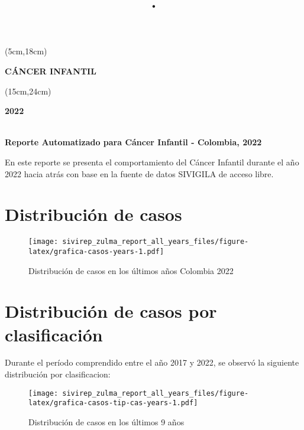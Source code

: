 \documentclass[
  a4paper,
]{article}
\title{\textcolor{colortitle}{.}}
\author{}
\date{\vspace{-2.5em}}
\begin{document}
\maketitle

\begin{textblock*}{15cm}(5cm,18cm) %
  \begin{flushright}
     \Huge{\textbf{CÁNCER INFANTIL \\ }}
  \end{flushright}
\end{textblock*}

\begin{textblock*}{5cm}(15cm,24cm) %
  \begin{flushright}
     \Huge{\textbf{2022}}
  \end{flushright}
\end{textblock*}

\newpage

\begin{center}
  \huge{\textbf{\\ Reporte Automatizado para Cáncer Infantil  - Colombia, 2022}}
\end{center}


En este reporte se presenta el comportamiento del Cáncer Infantil
durante el año 2022 hacia atrás con base en la fuente de datos SIVIGILA
de acceso libre.

\hypertarget{distribuciuxf3n-de-casos}{%
\section{Distribución de casos}\label{distribuciuxf3n-de-casos}}

\begin{figure}
\centering
\texttt{[image: sivirep\_zulma\_report\_all\_years\_files/figure-latex/grafica-casos-years-1.pdf]}
\caption{Distribución de casos en los últimos años Colombia 2022}
\end{figure}

\hypertarget{distribuciuxf3n-de-casos-por-clasificaciuxf3n}{%
\section{Distribución de casos por
clasificación}\label{distribuciuxf3n-de-casos-por-clasificaciuxf3n}}

Durante el período comprendido entre el año 2017 y 2022, se observó la
siguiente distribución por clasificacion:

\begin{figure}
\centering
\texttt{[image: sivirep\_zulma\_report\_all\_years\_files/figure-latex/grafica-casos-tip-cas-years-1.pdf]}
\caption{Distribución de casos en los últimos 9 años}
\end{figure}
\end{document}
